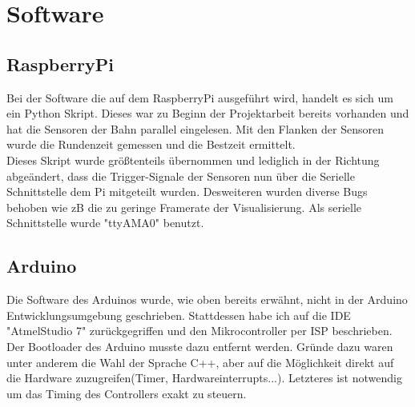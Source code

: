 \documentclass[a4paper, 11pt]{report}
\begin{document}
\chapter{Software}
	\section{RaspberryPi}

		Bei der Software die auf dem RaspberryPi ausgeführt wird, handelt es sich um ein Python Skript.
		Dieses war zu Beginn der Projektarbeit bereits vorhanden und hat die Sensoren
		der Bahn parallel eingelesen. Mit den Flanken der Sensoren wurde die Rundenzeit gemessen
		und die Bestzeit ermittelt.\\
		Dieses Skript wurde größtenteils übernommen und lediglich in der Richtung abgeändert,
		dass die Trigger-Signale der Sensoren nun über die Serielle Schnittstelle dem Pi mitgeteilt wurden.
		Desweiteren wurden diverse Bugs behoben wie zB die zu geringe Framerate der Visualisierung.
		Als serielle Schnittstelle wurde "ttyAMA0" benutzt.
		\newpage
	\section{Arduino}
		Die Software des Arduinos wurde, wie oben bereits erwähnt, nicht in der Arduino Entwicklungsumgebung
		geschrieben. Stattdessen habe ich auf die IDE "AtmelStudio 7" zurückgegriffen und den Mikrocontroller
		per ISP beschrieben. Der Bootloader des Arduino musste dazu entfernt werden.
		Gründe dazu waren unter anderem die Wahl der Sprache C++,
		aber auf die Möglichkeit direkt auf die Hardware zuzugreifen(Timer, Hardwareinterrupts...).
		Letzteres ist notwendig um das Timing des Controllers exakt zu steuern.\\
\end{document}
